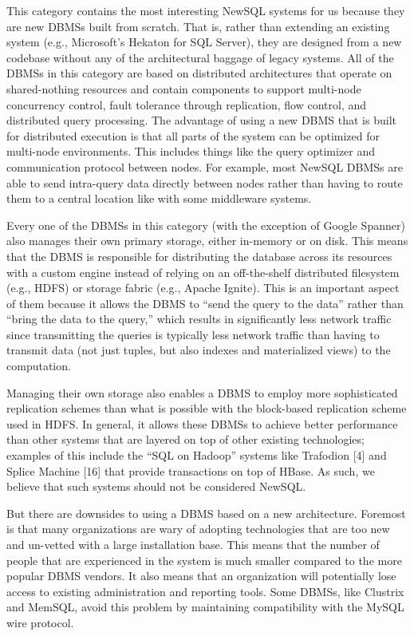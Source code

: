 \documentclass[a4paper,12pt,notitlepage,twoside,openright]{article}
\begin{document}
This category contains the most interesting NewSQL systems for us
because they are new DBMSs built from scratch. That is, rather than
extending an existing system (e.g., Microsoft's Hekaton for SQL Server),
they are designed from a new codebase without any of the architectural
baggage of legacy systems. All of the DBMSs in this category are based
on distributed architectures that operate on shared-nothing resources
and contain components to support multi-node concurrency control, fault
tolerance through replication, flow control, and distributed query
processing. The advantage of using a new DBMS that is built for
distributed execution is that all parts of the system can be optimized
for multi-node environments. This includes things like the query
optimizer and communication protocol between nodes. For example, most
NewSQL DBMSs are able to send intra-query data directly between nodes
rather than having to route them to a central location like with some
middleware systems.

Every one of the DBMSs in this category (with the exception of Google
Spanner) also manages their own primary storage, either in-memory or on
disk. This means that the DBMS is responsible for distributing the
database across its resources with a custom engine instead of relying on
an off-the-shelf distributed filesystem (e.g., HDFS) or storage fabric
(e.g., Apache Ignite). This is an important aspect of them because it
allows the DBMS to ``send the query to the data'' rather than ``bring
the data to the query,'' which results in significantly less network
traffic since transmitting the queries is typically less network traffic
than having to transmit data (not just tuples, but also indexes and
materialized views) to the computation.

Managing their own storage also enables a DBMS to employ more
sophisticated replication schemes than what is possible with the
block-based replication scheme used in HDFS. In general, it allows these
DBMSs to achieve better performance than other systems that are layered
on top of other existing technologies; examples of this include the
``SQL on Hadoop'' systems like Trafodion {[}4{]} and Splice Machine
{[}16{]} that provide transactions on top of HBase. As such, we believe
that such systems should not be considered NewSQL.

But there are downsides to using a DBMS based on a new architecture.
Foremost is that many organizations are wary of adopting technologies
that are too new and un-vetted with a large installation base. This
means that the number of people that are experienced in the system is
much smaller compared to the more popular DBMS vendors. It also means
that an organization will potentially lose access to existing
administration and reporting tools. Some DBMSs, like Clustrix and
MemSQL, avoid this problem by maintaining compatibility with the MySQL
wire protocol.
\end{document}
